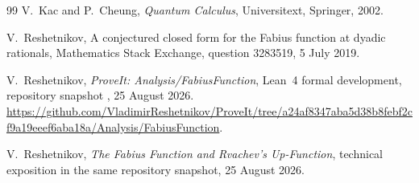 \documentclass[11pt,oneside]{article}
\theoremstyle{definition}
\theoremstyle{remark}
\begin{document}
\begin{thebibliography}{99}
V.~Kac and P.~Cheung,
\newblock \emph{Quantum Calculus},
\newblock Universitext, Springer, 2002.

V.~Reshetnikov,
\newblock A conjectured closed form for the Fabius function at dyadic rationals,
\newblock Mathematics Stack Exchange, question 3283519, 5 July 2019.

V.~Reshetnikov,
\newblock \emph{ProveIt: Analysis/FabiusFunction},
\newblock Lean~4 formal development, repository snapshot
  , 25 August 2026.
\newblock
\url{https://github.com/VladimirReshetnikov/ProveIt/tree/a24af8347aba5d38b8febf2cf9a19eeef6aba18a/Analysis/FabiusFunction}.

V.~Reshetnikov,
\newblock \emph{The Fabius Function and Rvachev's Up-Function},
\newblock technical exposition in the same repository snapshot, 25 August 2026.

\end{thebibliography}
\end{document}
